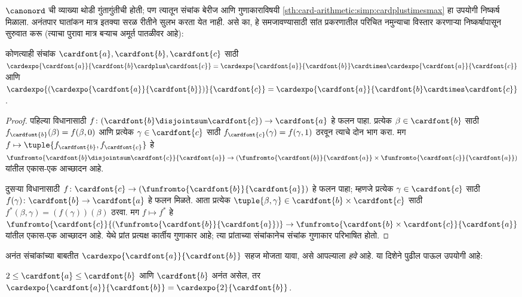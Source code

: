 $\canonord$ ची व्याख्या थोडी गुंतागुंतीची होती; पण त्यातून संचांक बेरीज आणि गुणाकाराविषयी \ref{sth:card-arithmetic:simp:cardplustimesmax} हा उपयोगी निष्कर्ष मिळाला. अनंतपार घातांकन मात्र इतक्या सरळ रीतीने सुलभ करता येत नाही. असे का, हे समजावण्यासाठी सांत प्रकरणातील परिचित नमुन्याचा विस्तार करणाऱ्या निष्कर्षापासून सुरुवात करू (त्याचा पुरावा मात्र बऱ्याच अमूर्त पातळीवर आहे):

\begin{prop}\label{sth:card-arithmetic:expotough:simplecardexpo}
कोणत्याही संचांक $\cardfont{a}, \cardfont{b}, \cardfont{c}$ साठी
$\cardexpo{\cardfont{a}}{\cardfont{b} \cardplus \cardfont{c}} =
\cardexpo{\cardfont{a}}{\cardfont{b}} \cardtimes
\cardexpo{\cardfont{a}}{\cardfont{c}}$ आणि
$\cardexpo{(\cardexpo{\cardfont{a}}{\cardfont{b}})}{\cardfont{c}} =
\cardexpo{\cardfont{a}}{\cardfont{b} \cardtimes \cardfont{c}}$.
\end{prop}

\begin{proof}
पहिल्या विधानासाठी $f \colon
(\cardfont{b}\disjointsum\cardfont{c}) \to \cardfont{a}$ हे फलन पाहा. प्रत्येक
$\beta \in \cardfont{b}$ साठी $f_\cardfont{b}(\beta) = f(\beta, 0)$ आणि प्रत्येक
$\gamma \in \cardfont{c}$ साठी $f_\cardfont{c}(\gamma) = f(\gamma, 1)$ ठरवून त्याचे दोन भाग करा. मग $f \mapsto
\tuple{f_{\cardfont{b}}, f_{\cardfont{c}}}$ हे
$\funfromto{\cardfont{b} \disjointsum \cardfont{c}}{\cardfont{a}} \to
(\funfromto{\cardfont{b}}{\cardfont{a}} \times
\funfromto{\cardfont{c}}{\cardfont{a}})$ यांतील एकास-एक आच्छादन आहे.

दुसऱ्या विधानासाठी $f \colon \cardfont{c} \to
(\funfromto{\cardfont{b}}{\cardfont{a}})$ हे फलन पाहा; म्हणजे प्रत्येक $\gamma \in
\cardfont{c}$ साठी $f(\gamma) \colon \cardfont{b} \to
\cardfont{a}$ हे फलन मिळते. आता प्रत्येक $\tuple{\beta, \gamma} \in \cardfont{b} \times \cardfont{c}$ साठी $f^*(\beta, \gamma) = (f(\gamma))(\beta)$ ठरवा.
मग $f \mapsto f^*$ हे
$\funfromto{\cardfont{c}}{(\funfromto{\cardfont{b}}{\cardfont{a}})}
\to \funfromto{\cardfont{b} \times \cardfont{c}}{\cardfont{a}}$ यांतील एकास-एक आच्छादन आहे. येथे प्रांत प्रत्यक्ष कार्तीय गुणाकार आहे; त्या प्रांताच्या संचांकानेच संचांक गुणाकार परिभाषित होतो.
\end{proof}

अनंत संचांकांच्या बाबतीत $\cardexpo{\cardfont{a}}{\cardfont{b}}$ सहज मोजता यावा, असे आपल्याला \emph{हवे} आहे. या दिशेने पुढील पाऊल उपयोगी आहे:

\begin{prop}\label{sth:card-arithmetic:expotough:cardexpo2reduct}
$2 \leq \cardfont{a} \leq \cardfont{b}$ आणि $\cardfont{b}$ अनंत असेल, तर $\cardexpo{\cardfont{a}}{\cardfont{b}} =
\cardexpo{2}{\cardfont{b}}$.
\end{prop}

